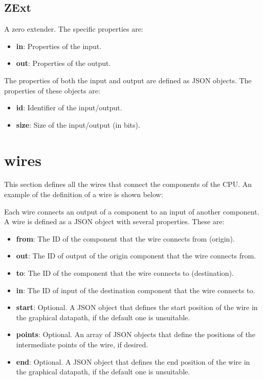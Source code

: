 \documentclass[11pt,a4paper,twoside,titlepage]{report}
\begin{document}
\subsection{ZExt}

A zero extender. The specific properties are:
\begin{itemize}
	\item \textbf{in}: Properties of the input.
	\item \textbf{out}: Properties of the output.
\end{itemize}

The properties of both the input and output are defined as JSON objects. 
The properties of these objects are:
\begin{itemize}
	\item \textbf{id}: Identifier of the input/output.
	\item \textbf{size}: Size of the input/output (in bits).
\end{itemize}


\section{wires}

This section defines all the wires that connect the components of the CPU.
An example of the definition of a wire is shown below:



Each wire connects an output of a component to an input of another component.
A wire is defined as a JSON object with several properties.
These are:

\begin{itemize}
	\item \textbf{from}: The ID of the component that the wire connects from (origin).
	\item \textbf{out}: The ID of output of the origin component that the wire
		connects from.
	\item \textbf{to}: The ID of the component that the wire connects to (destination).
	\item \textbf{in}: The ID of input of the destination component that the wire
		connects to.
	\item \textbf{start}: Optional. A JSON object that defines the start position of
		the wire in the graphical datapath, if the default one is unsuitable.
	\item \textbf{points}: Optional. An array of JSON objects that define the
		positions of the intermediate points of the wire, if desired.
	\item \textbf{end}: Optional. A JSON object that defines the end position of
		the wire in the graphical datapath, if the default one is unsuitable.
\end{itemize}
\end{document}
